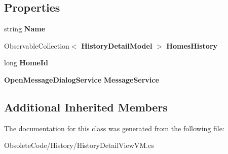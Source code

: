 \subsection*{Properties}
\begin{DoxyCompactItemize}
\item 
\mbox{\label{class_a_f_h___scheduler_1_1_history_1_1_history_detail_view_v_m_adb6eb6366e161b71daa623d5fcdf7194}} 
string {\bfseries Name}\hspace{0.3cm}{\ttfamily  [get]}
\item 
\mbox{\label{class_a_f_h___scheduler_1_1_history_1_1_history_detail_view_v_m_ab9503fc882bf6159d1c55a43f2e7f448}} 
Observable\+Collection$<$ \textbf{ History\+Detail\+Model} $>$ {\bfseries Homes\+History}\hspace{0.3cm}{\ttfamily  [get, set]}
\item 
\mbox{\label{class_a_f_h___scheduler_1_1_history_1_1_history_detail_view_v_m_a570da79516282e855fa7dd80b1a1cd7d}} 
long {\bfseries Home\+Id}\hspace{0.3cm}{\ttfamily  [get, set]}
\item 
\mbox{\label{class_a_f_h___scheduler_1_1_history_1_1_history_detail_view_v_m_a2f038b9c5c060b2b7c5ce2dd9ff0c0c5}} 
\textbf{ Open\+Message\+Dialog\+Service} {\bfseries Message\+Service}\hspace{0.3cm}{\ttfamily  [get, set]}
\end{DoxyCompactItemize}
\subsection*{Additional Inherited Members}


The documentation for this class was generated from the following file\+:\begin{DoxyCompactItemize}
\item 
Obsolete\+Code/\+History/History\+Detail\+View\+V\+M.\+cs\end{DoxyCompactItemize}
